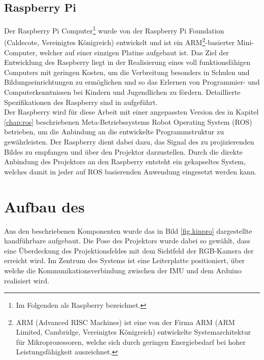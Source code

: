 \subsection{Raspberry Pi\textsuperscript{\texttrademark}}
Der Raspberry Pi\textsuperscript{\texttrademark} Computer\footnote{Im Folgenden als Raspberry bezeichnet.} wurde von der Raspberry Pi Foundation (Caldecote, Vereinigtes Königreich) entwickelt und ist ein ARM\footnote{ARM (Advanced RISC Machines) ist eine von der Firma ARM (ARM Limited, Cambridge, Vereinigtes Königreich) entwickelte Systemarchitektur für Mikroprozessoren, welche sich durch geringen Energiebedarf bei hoher Leistungsfähigkeit auszeichnet.}-basierter Mini-Computer, welcher auf einer einzigen Platine aufgebaut ist. Das Ziel der Entwicklung des Raspberry liegt in der Realisierung eines voll funktionsfähigen Computers mit geringen Kosten, um die Verbreitung besonders in Schulen und Bildungseinrichtungen zu ermöglichen und so das Erlernen von Programmier- und Computerkenntnissen bei Kindern und Jugendlichen zu fördern. Detaillierte Spezifikationen des Raspberry sind in  aufgeführt.\\

Der Raspberry wird für diese Arbeit mit einer angepassten Version des in Kapitel \ref{chap:ros} beschriebenen Meta-Betriebssystems Robot Operating System (ROS) betrieben, um die Anbindung an die entwickelte Programmstruktur zu gewährleisten. Der Raspberry dient dabei dazu, das Signal des zu projizierenden Bildes zu empfangen und über den Projektor darzustellen. Durch die direkte Anbindung des Projektors an den Raspberry entsteht ein gekapseltes System, welches damit in jeder auf ROS basierenden Anwendung eingesetzt werden kann.


\section{Aufbau des }
Aus den beschriebenen Komponenten wurde das in Bild \ref{fig.kinpro} dargestellte handführbare \kps{} aufgebaut. Die Pose des Projektors wurde dabei so gewählt, dass eine Überdeckung des Projektionsfeldes mit dem Sichtfeld der RGB-Kamera der \kin erreicht wird. Im Zentrum des Systems ist eine Leiterplatte positioniert, über welche die Kommunikationsverbindung zwischen der IMU und dem Arduino realisiert wird.\\

